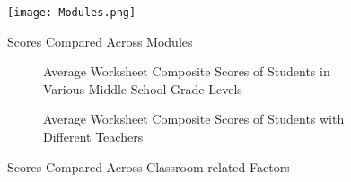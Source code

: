 {\begin{figure}
    \centering
    \texttt{[image: Modules.png]}
    \caption{\ts Scores Compared Across Modules}
    \label{fig:curriculum_factors}
\end{figure}

\begin{figure}
     \centering
    \begin{subfigure}[t]{0.49\textwidth}
        \caption{Average \ts Worksheet Composite Scores of Students in Various Middle-School Grade Levels}
        \label{fig:grade_factors}
    \end{subfigure}
    \hfill
    \begin{subfigure}[t]{0.49\textwidth}
        \caption{Average \ts Worksheet Composite Scores of Students with Different Teachers}
        \label{fig:teacher_factors}
    \end{subfigure}
    \caption{\ts Scores Compared Across Classroom-related Factors}
    \label{fig:classroom_factors}
\end{figure}



}
